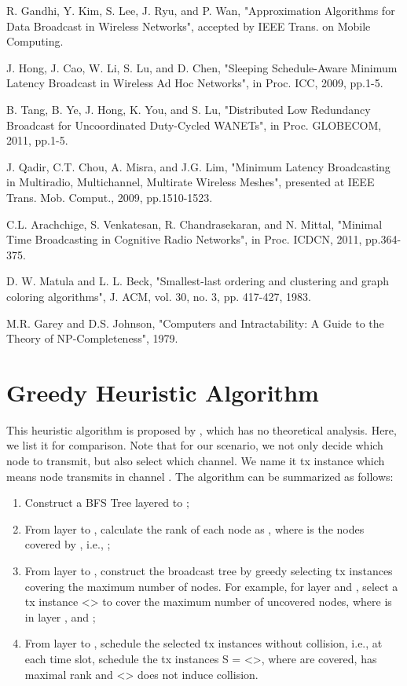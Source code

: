 \documentclass[10pt, conference]{IEEEtran}
\begin{document}
\begin{thebibliography}{1}
R. Gandhi, Y. Kim, S. Lee, J. Ryu,  and P. Wan,  "Approximation Algorithms for Data Broadcast in Wireless
Networks", accepted by IEEE Trans. on Mobile Computing.


J. Hong, J. Cao, W. Li, S. Lu,  and D. Chen,  "Sleeping Schedule-Aware Minimum Latency Broadcast in Wireless Ad Hoc Networks",  in Proc. ICC, 2009, pp.1-5.

B. Tang, B. Ye, J. Hong, K. You,  and S. Lu,  "Distributed Low Redundancy Broadcast for Uncoordinated Duty-Cycled WANETs", in Proc. GLOBECOM, 2011, pp.1-5.



J. Qadir, C.T. Chou, A. Misra,  and J.G. Lim,  "Minimum Latency Broadcasting in Multiradio, Multichannel, Multirate Wireless Meshes",  presented at IEEE Trans. Mob. Comput., 2009, pp.1510-1523.




C.L. Arachchige, S. Venkatesan, R. Chandrasekaran,  and N. Mittal,  "Minimal Time Broadcasting in Cognitive Radio Networks",  in Proc. ICDCN, 2011, pp.364-375.



D. W. Matula and L. L. Beck, "Smallest-last ordering and clustering and
graph coloring algorithms", J. ACM, vol. 30, no. 3, pp. 417-427, 1983.

M.R. Garey and D.S. Johnson,  "Computers and Intractability: A Guide to the Theory of NP-Completeness",  1979.


\end{thebibliography}

\iffalse
\appendices
\section{Greedy Heuristic Algorithm}
This heuristic algorithm is proposed by \cite{ICDCN10}, which
has no theoretical analysis. Here, we list it for comparison.
Note that for our scenario, we not only decide which
node to transmit, but also select which channel. We name it
tx instance  which means node  transmits in channel
. The algorithm can be summarized as follows:
\begin{enumerate}
\item Construct a BFS Tree layered  to ;
\item From layer  to , calculate the rank of each node as
, where  is the nodes covered by , i.e., ;
\item From layer  to , construct the broadcast tree
by greedy selecting tx instances covering the
maximum number of nodes. For example, for layer 
and , select a tx instance <> to cover the maximum
number of uncovered nodes, where  is in layer , and ;
\item From layer  to , schedule the selected tx
instances without collision, i.e., at each time slot, schedule the tx instances S = <>, where
 are covered, has maximal rank and <> does not induce collision.
\end{enumerate}
\end{document}
